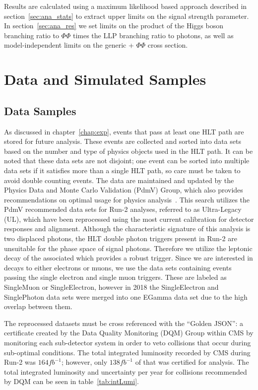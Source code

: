 Results are calculated using a maximum likelihood based approach described in section~\ref{sec:ana_stats} to extract upper limits on the signal strength parameter. In section~\ref{sec:ana_res} we set limits on the product of the Higgs boson branching ratio to $\Phi\Phi$ times the LLP branching ratio to photons, as well as model-independent limits on the generic \PZ + $\Phi\Phi$ cross section.

\section{Data and Simulated Samples} \label{sec:ana_samples}

\subsection{Data Samples} \label{sec:ana_data}
As discussed in chapter~\ref{chap:exp}, events that pass at least one HLT path are stored for future analysis. These events are collected and sorted into data sets based on the number and type of physics objects used in the HLT path. It can be noted that these data sets are not disjoint; one event can be sorted into multiple data sets if it satisfies more than a single HLT path, so care must be taken to avoid double counting events. The data are maintained and updated by the Physics Data and Monte Carlo Validation (PdmV) Group, which also provides recommendations on optimal usage for physics analysis~\cite{pdmv}. This search utilizes the PdmV recommended data sets for Run-2 analyses, referred to as Ultra-Legacy (UL), which have been reprocessed using the most current calibration for detector responses and alignment. Although the characteristic signature of this analysis is two displaced photons, the HLT double photon triggers present in Run-2 are unsuitable for the phase space of signal photons. Therefore we utilize the leptonic decay of the associated \PZ which provides a robust trigger. Since we are interested in \PZ decays to either electrons or muons, we use the data sets containing events passing the single electron and single muon triggers. These are labeled as SingleMuon or SingleElectron, however in 2018 the SingleElectron and SinglePhoton data sets were merged into one EGamma data set due to the high overlap between them.

The reprocessed datasets must be cross referenced with the ``Golden JSON'': a certificate created by the Data Quality Monitoring (DQM) Group within CMS by monitoring each sub-detector system in order to veto collisions that occur during sub-optimal conditions. The total integrated luminosity recorded by CMS during Run-2 was $164\unit{fb^{-1}}$; however, only $138\unit{fb^{-1}}$ of that was certified for analysis. The total integrated luminosity and uncertainty per year for collisions recommended by DQM can be seen in table~\ref{tab:intLumi}.

